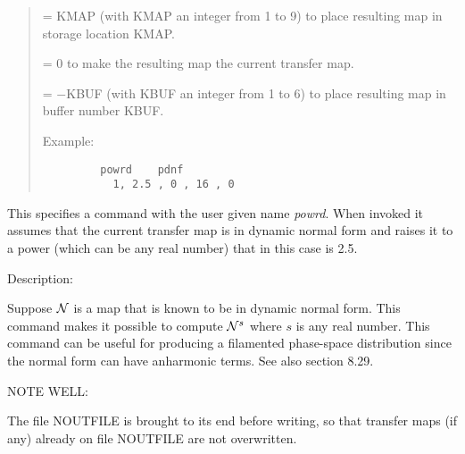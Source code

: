 \begin{quotation}
\begin{enumerate}
             = KMAP (with KMAP an integer from 1 to 9) to place resulting
               map in \hspace*{1em}storage location KMAP.

             = 0 to make the resulting map the current transfer map.

             = $-$KBUF (with KBUF an integer from 1 to 6) to place resulting
               map in \hspace*{1em}buffer number KBUF.
\end{enumerate}

\vspace{5mm}
\noindent Example:
\begin{verbatim}
         powrd    pdnf
           1, 2.5 , 0 , 16 , 0
\end{verbatim}
\end{quotation}
This specifies a command with the user given name {\em powrd}.  When invoked it assumes that the current transfer map is in dynamic normal form and raises it to a power (which can be any real number) that in this case is 2.5.

\vspace{5mm}
     Description:
\vspace{2mm}

Suppose ${\cal N}$ is a map that is known to be in dynamic normal form.  This command makes it possible to compute ${\cal N}^s$ where $s$ is any real number.  This command can be useful for producing a filamented phase-space distribution since the normal form can have anharmonic terms.  See also section 8.29.

\vspace{5mm}
NOTE WELL:
\vspace{2mm}

     The file NOUTFILE is brought to its end before writing, so that
transfer maps (if any) already on file NOUTFILE are not overwritten.

\newpage
